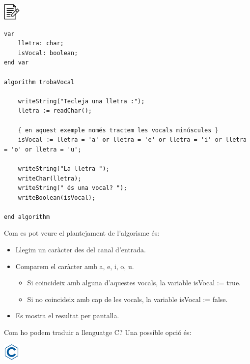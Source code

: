 \documentclass[]{book}
\providecommand{\tightlist}{%
  \setlength{\itemsep}{0pt}\setlength{\parskip}{0pt}}
\begin{document}
\includegraphics{./img/alg.png}

\begin{verbatim}
var
    lletra: char;
    isVocal: boolean;
end var

algorithm trobaVocal

    writeString("Tecleja una lletra :");
    lletra := readChar();

    { en aquest exemple només tractem les vocals minúscules }
    isVocal := lletra = 'a' or lletra = 'e' or lletra = 'i' or lletra = 'o' or lletra = 'u';

    writeString("La lletra ");
    writeChar(lletra);
    writeString(" és una vocal? ");
    writeBoolean(isVocal);

end algorithm
\end{verbatim}

Com es pot veure el plantejament de l'algorisme és:

\begin{itemize}
\tightlist
\item
  Llegim un caràcter des del canal d'entrada.
\item
  Comparem el caràcter amb a, e, i, o, u.

  \begin{itemize}
  \tightlist
  \item
    Si coincideix amb alguna d'aquestes vocals, la variable isVocal :=
    true.
  \item
    Si no coincideix amb cap de les vocals, la variable isVocal :=
    false.
  \end{itemize}
\item
  Es mostra el resultat per pantalla.
\end{itemize}

Com ho podem traduir a llenguatge C? Una possible opció és:

\includegraphics{./img/c.png}
\end{document}
